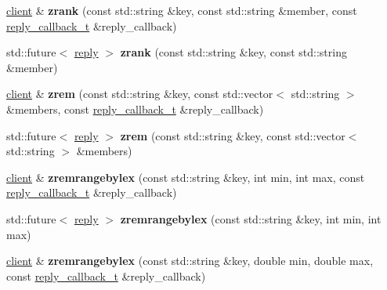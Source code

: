 \begin{DoxyCompactItemize}
\hyperlink{classcpp__redis_1_1client}{client} \& {\bfseries zrank} (const std\+::string \&key, const std\+::string \&member, const \hyperlink{classcpp__redis_1_1client_a061a1140d36d2eaeda82b09a0bb3f9f2}{reply\+\_\+callback\+\_\+t} \&reply\+\_\+callback)
\item 
\mbox{\label{classcpp__redis_1_1client_acf680674a3944a3baaa36f888250610e}} 
std\+::future$<$ \hyperlink{classcpp__redis_1_1reply}{reply} $>$ {\bfseries zrank} (const std\+::string \&key, const std\+::string \&member)
\item 
\mbox{\label{classcpp__redis_1_1client_ae33a0ea1127a5da870db4354fad2bd10}} 
\hyperlink{classcpp__redis_1_1client}{client} \& {\bfseries zrem} (const std\+::string \&key, const std\+::vector$<$ std\+::string $>$ \&members, const \hyperlink{classcpp__redis_1_1client_a061a1140d36d2eaeda82b09a0bb3f9f2}{reply\+\_\+callback\+\_\+t} \&reply\+\_\+callback)
\item 
\mbox{\label{classcpp__redis_1_1client_aff2e5ec7005f76869fad79c4e8bd68c8}} 
std\+::future$<$ \hyperlink{classcpp__redis_1_1reply}{reply} $>$ {\bfseries zrem} (const std\+::string \&key, const std\+::vector$<$ std\+::string $>$ \&members)
\item 
\mbox{\label{classcpp__redis_1_1client_aff3c4f11d504ba64a98b6bce9bf319a0}} 
\hyperlink{classcpp__redis_1_1client}{client} \& {\bfseries zremrangebylex} (const std\+::string \&key, int min, int max, const \hyperlink{classcpp__redis_1_1client_a061a1140d36d2eaeda82b09a0bb3f9f2}{reply\+\_\+callback\+\_\+t} \&reply\+\_\+callback)
\item 
\mbox{\label{classcpp__redis_1_1client_a9277ebc759190ce6f085a60a98ad3a7c}} 
std\+::future$<$ \hyperlink{classcpp__redis_1_1reply}{reply} $>$ {\bfseries zremrangebylex} (const std\+::string \&key, int min, int max)
\item 
\mbox{\label{classcpp__redis_1_1client_ae03899c0520352eb6a800b9d6c12f2ae}} 
\hyperlink{classcpp__redis_1_1client}{client} \& {\bfseries zremrangebylex} (const std\+::string \&key, double min, double max, const \hyperlink{classcpp__redis_1_1client_a061a1140d36d2eaeda82b09a0bb3f9f2}{reply\+\_\+callback\+\_\+t} \&reply\+\_\+callback)

\end{DoxyCompactItemize}
